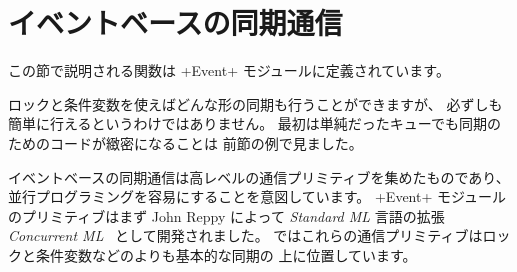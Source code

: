 \section{イベントベースの同期通信}

この節で説明される関数は \ml+Event+ モジュールに定義されています。

ロックと条件変数を使えばどんな形の同期も行うことができますが、
必ずしも簡単に行えるというわけではありません。
最初は単純だったキューでも同期のためのコードが緻密になることは
前節の例で見ました。

イベントベースの同期通信は高レベルの通信プリミティブを集めたものであり、
並行プログラミングを容易にすることを意図しています。
\ml+Event+ モジュールのプリミティブはまず John Reppy によって \emph{Standard ML} 言語の拡張
\emph{Concurrent ML}~\cite{CML} として開発されました。
\ocaml ではこれらの通信プリミティブはロックと条件変数などのよりも基本的な同期の
上に位置しています。

